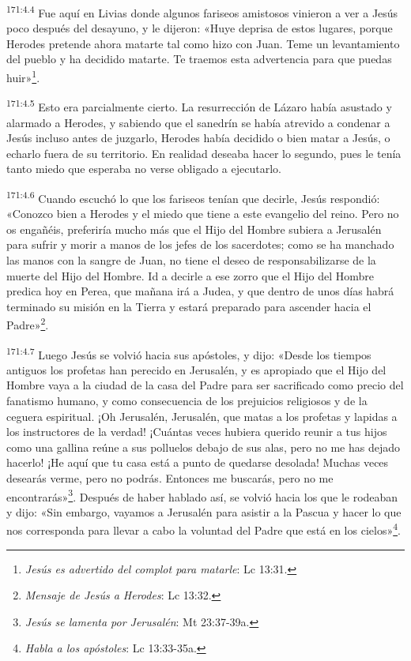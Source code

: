 \par
\textsuperscript{171:4.4} Fue aquí en Livias donde algunos fariseos amistosos vinieron a ver a Jesús poco después del desayuno, y le dijeron: «Huye deprisa de estos lugares, porque Herodes pretende ahora matarte tal como hizo con Juan. Teme un levantamiento del pueblo y ha decidido matarte. Te traemos esta advertencia para que puedas huir»\footnote{\textit{Jesús es advertido del complot para matarle}: Lc 13:31.}.

\par
\textsuperscript{171:4.5} Esto era parcialmente cierto. La resurrección de Lázaro había asustado y alarmado a Herodes, y sabiendo que el sanedrín se había atrevido a condenar a Jesús incluso antes de juzgarlo, Herodes había decidido o bien matar a Jesús, o echarlo fuera de su territorio. En realidad deseaba hacer lo segundo, pues le tenía tanto miedo que esperaba no verse obligado a ejecutarlo.

\par
\textsuperscript{171:4.6} Cuando escuchó lo que los fariseos tenían que decirle, Jesús respondió: «Conozco bien a Herodes y el miedo que tiene a este evangelio del reino. Pero no os engañéis, preferiría mucho más que el Hijo del Hombre subiera a Jerusalén para sufrir y morir a manos de los jefes de los sacerdotes; como se ha manchado las manos con la sangre de Juan, no tiene el deseo de responsabilizarse de la muerte del Hijo del Hombre. Id a decirle a ese zorro que el Hijo del Hombre predica hoy en Perea, que mañana irá a Judea, y que dentro de unos días habrá terminado su misión en la Tierra y estará preparado para ascender hacia el Padre»\footnote{\textit{Mensaje de Jesús a Herodes}: Lc 13:32.}.

\par
\textsuperscript{171:4.7} Luego Jesús se volvió hacia sus apóstoles, y dijo: «Desde los tiempos antiguos los profetas han perecido en Jerusalén, y es apropiado que el Hijo del Hombre vaya a la ciudad de la casa del Padre para ser sacrificado como precio del fanatismo humano, y como consecuencia de los prejuicios religiosos y de la ceguera espiritual. ¡Oh Jerusalén, Jerusalén, que matas a los profetas y lapidas a los instructores de la verdad! ¡Cuántas veces hubiera querido reunir a tus hijos como una gallina reúne a sus polluelos debajo de sus alas, pero no me has dejado hacerlo! ¡He aquí que tu casa está a punto de quedarse desolada! Muchas veces desearás verme, pero no podrás. Entonces me buscarás, pero no me encontrarás»\footnote{\textit{Jesús se lamenta por Jerusalén}: Mt 23:37-39a.}. Después de haber hablado así, se volvió hacia los que le rodeaban y dijo: «Sin embargo, vayamos a Jerusalén para asistir a la Pascua y hacer lo que nos corresponda para llevar a cabo la voluntad del Padre que está en los cielos»\footnote{\textit{Habla a los apóstoles}: Lc 13:33-35a.}.

